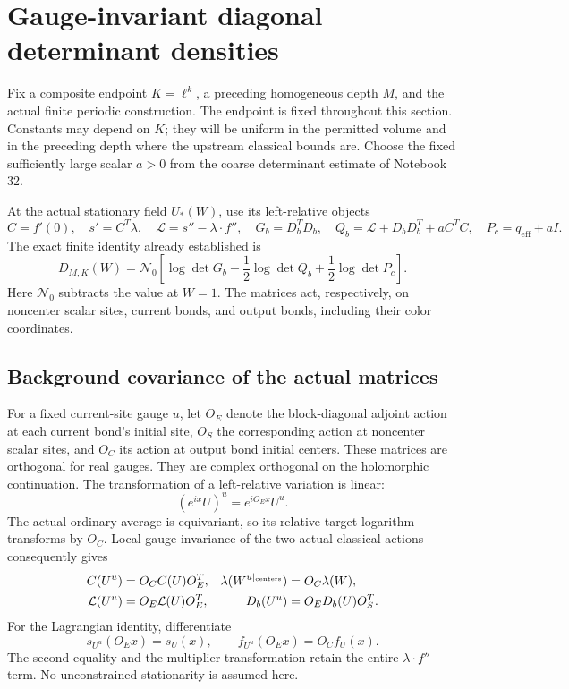 \documentclass[11pt]{article}
\theoremstyle{remark}
\begin{document}
\section{Gauge-invariant diagonal determinant densities}
\label{gdd-section}

Fix a composite endpoint \(K=\ell^k\), a preceding homogeneous
depth \(M\), and the actual finite periodic construction. The
endpoint is fixed throughout this section. Constants may depend
on \(K\); they will be uniform in the permitted volume and in
the preceding depth where the upstream classical bounds are.
Choose the fixed sufficiently large scalar \(a>0\) from the
coarse determinant estimate of Notebook 32.

At the actual stationary field \(U_*(W)\), use its left-relative
objects
\[
 C=f'(0),\quad s'=C^T\lambda,\quad
 \mathcal L=s''-\lambda\cdot f'',\quad
 G_b=D_b^TD_b,\quad
 Q_b=\mathcal L+D_bD_b^T+aC^TC,\quad
 P_c=q_{\mathrm{eff}}+aI.
\]
The exact finite identity already established is
\begin{equation}
 D_{M,K}(W)=\mathcal N_0\left[
       \log\det G_b-\frac12\log\det Q_b
                           +\frac12\log\det P_c\right].
 \label{gdd-exact-total}
\end{equation}
Here \(\mathcal N_0\) subtracts the value at \(W=1\).
The matrices act, respectively, on noncenter scalar sites,
current bonds, and output bonds, including their color coordinates.

\subsection{Background covariance of the actual matrices}
\label{gdd-covariance-section}

For a fixed current-site gauge \(u\), let \(O_E\) denote
the block-diagonal adjoint action at each current bond's
initial site, \(O_S\) the corresponding action at noncenter
scalar sites, and \(O_C\) its action at output bond initial
centers. These matrices are orthogonal for real gauges.
They are complex orthogonal on the holomorphic continuation.
The transformation of a left-relative variation is linear:
\[
 (e^{ix}U)^u=e^{iO_Ex}U^u.
\]
The actual ordinary average is equivariant, so its relative
target logarithm transforms by \(O_C\). Local gauge invariance
of the two actual classical actions consequently gives
\begin{align}
 C(U^u)&=O_C C(U)O_E^T,&
 \lambda(W^{u|_{\rm centers}})&=O_C\lambda(W),\notag\\
 \mathcal L(U^u)&=O_E\mathcal L(U)O_E^T,&
 D_b(U^u)&=O_E D_b(U)O_S^T. \label{gdd-transformations}
\end{align}
For the Lagrangian identity, differentiate
\[
 s_{U^u}(O_Ex)=s_U(x),\qquad
 f_{U^u}(O_Ex)=O_Cf_U(x).
\]
The second equality and the multiplier transformation retain
the entire \(\lambda\cdot f''\) term. No unconstrained
stationarity is assumed here.
\end{document}
